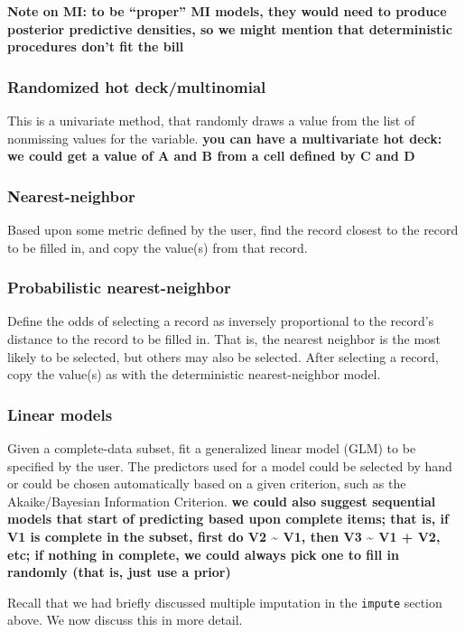 \documentclass{article}
\begin{document}
{{\bf Note on MI: to be ``proper'' MI models, they would need to produce
posterior predictive densities, so we might mention that deterministic
procedures don't fit the bill}

\subsubsection{Randomized hot deck/multinomial} This is a univariate method, that
randomly draws a value from the list of nonmissing values for the variable.
{\bf you can have a multivariate hot deck: we could get a value of A and B
from a cell defined by C and D}

\subsubsection{Nearest-neighbor} Based upon some metric defined by the user, find the
record closest to the record to be filled in, and copy the value(s) from that
record.

\subsubsection{Probabilistic nearest-neighbor} Define the odds of selecting a record
as inversely proportional to the record's distance to the record to be filled
in. That is, the nearest neighbor is the most likely to be selected, but others
may also be selected. After selecting a record, copy the value(s) as with
the deterministic nearest-neighbor model.

\subsubsection{Linear models} Given a complete-data subset, fit a generalized linear
model (GLM) to be specified by the user. The predictors used for a model could
be selected by hand or could be chosen automatically based on a given
criterion, such as the Akaike/Bayesian Information Criterion.
{\bf we could also suggest sequential models that start of predicting based
upon complete items; that is, if V1 is complete in the subset, first do
V2 \~{} V1, then V3 \~{} V1 + V2, etc; if nothing in complete, we could
always pick one to fill in randomly (that is, just use a prior)}

}

Recall that we had briefly discussed multiple imputation in the {\tt impute} section above. 
We now discuss this in more detail.
\end{document}
